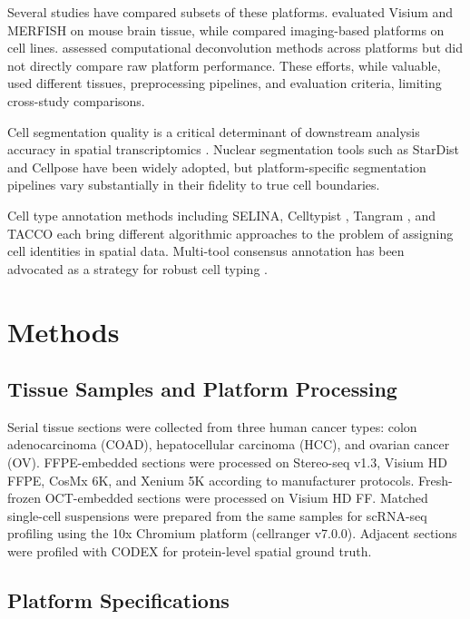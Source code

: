 \documentclass[11pt]{article}
\begin{document}
Several studies have compared subsets of these platforms. \citet{walker2023deciphering} evaluated Visium and MERFISH on mouse brain tissue, while \citet{lee2024benchmarking} compared imaging-based platforms on cell lines. \citet{long2023benchmarking} assessed computational deconvolution methods across platforms but did not directly compare raw platform performance. These efforts, while valuable, used different tissues, preprocessing pipelines, and evaluation criteria, limiting cross-study comparisons.

Cell segmentation quality is a critical determinant of downstream analysis accuracy in spatial transcriptomics \citep{petukhov2022cell}. Nuclear segmentation tools such as StarDist \citep{schmidt2018cell} and Cellpose \citep{stringer2020cellpose} have been widely adopted, but platform-specific segmentation pipelines vary substantially in their fidelity to true cell boundaries.

Cell type annotation methods including SELINA, Celltypist \citep{dominguez2022cross}, Tangram \citep{biancalani2021deep}, and TACCO \citep{li2023tacco} each bring different algorithmic approaches to the problem of assigning cell identities in spatial data. Multi-tool consensus annotation has been advocated as a strategy for robust cell typing \citep{abdelaal2019comparison}.

\section{Methods}

\subsection{Tissue Samples and Platform Processing}

Serial tissue sections were collected from three human cancer types: colon adenocarcinoma (COAD), hepatocellular carcinoma (HCC), and ovarian cancer (OV). FFPE-embedded sections were processed on Stereo-seq v1.3, Visium HD FFPE, CosMx 6K, and Xenium 5K according to manufacturer protocols. Fresh-frozen OCT-embedded sections were processed on Visium HD FF. Matched single-cell suspensions were prepared from the same samples for scRNA-seq profiling using the 10x Chromium platform (cellranger v7.0.0). Adjacent sections were profiled with CODEX for protein-level spatial ground truth.

\subsection{Platform Specifications}
\end{document}
